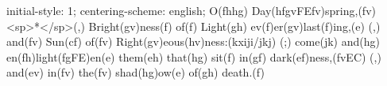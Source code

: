 initial-style: 1;
centering-scheme: english;
O(fhhg) Day(hfgvFEfv)spring,(fv) <sp>*</sp>(,) Bright(gv)ness(f) of(f) Light(gh) ev(f)er(gv)last(f)ing,(e) (,) and(fv) Sun(cf) of(fv) Right(gv)eous(hv)ness:(kxiji/jkj) (;) come(jk) and(hg) en(fh)light(fgFE)en(e) them(eh) that(hg) sit(f) in(gf) dark(ef)ness,(fvEC) (,) and(ev) in(fv) the(fv) shad(hg)ow(e) of(gh) death.(f)
